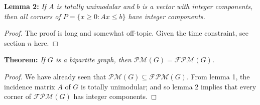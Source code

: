 \begin{frame}
	\textbf{Lemma 2:} \emph{If \( A \) is totally unimodular and \( b \) is a vector with integer components, then all corners of \( P = \{ x \geq 0 : Ax \leq b \}  \) have integer components.}
\begin{proof}
	The proof is long and somewhat off-topic. Given the time constraint, see section \( n \) \alert{here}.
\end{proof}
\end{frame}

\begin{frame}
	\textbf{Theorem:} \emph{If \( G \) is a bipartite graph, then \( \mathcal{PM} (G) = \mathcal{FPM} (G) \).}
\begin{proof}
We have already seen that \( \mathcal{PM} (G) \subseteq \mathcal{FPM} (G) \). From lemma 1, the incidence matrix \( A \) of \( G \) is totally unimodular; and so lemma 2 implies that every corner of \( \mathcal{FPM} (G) \) has integer components. 
\end{proof}
\end{frame}

